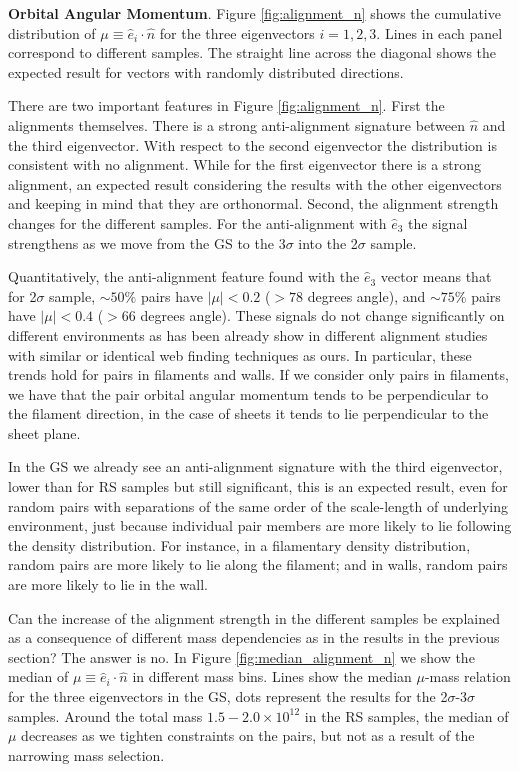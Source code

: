 \documentclass{emulateapj}
\newcommand{\msun}{{\ifmmode{{\rm {M_{\odot}}}}\else{${\rm{M_{\odot}}}$}\fi}}
\begin{document}
{\bf Orbital Angular Momentum}. Figure \ref{fig:alignment_n} shows the
cumulative distribution of $\mu\equiv\hat{e}_i\cdot\hat{n}$  for the
three eigenvectors $i=1,2,3$.    
Lines in each panel correspond to different samples.
The straight line across the diagonal shows the expected
result for vectors with randomly distributed directions.


There are two important features in Figure \ref{fig:alignment_n}.
First the alignments themselves. 
There is a strong anti-alignment signature between $\hat{n}$ and the
third eigenvector. 
With respect to the second eigenvector the distribution is consistent
with no alignment. 
While for the first eigenvector there is a strong alignment, an expected
result considering the results with the other eigenvectors and
keeping in mind that they are orthonormal.
Second, the alignment strength changes for the different samples. 
For the anti-alignment with $\hat{e}_3$ the signal strengthens as we
move from the GS to the 3$\sigma$ into the 2$\sigma$ sample.

Quantitatively, the anti-alignment feature found with the $\hat{e}_3$ 
vector means that for 2$\sigma$ sample, $\sim 50\%$ pairs have
$|\mu|<0.2$ ($>78$ degrees angle), and $\sim 75\%$ pairs have $|\mu|<0.4$
($>66$ degrees angle). 
These signals do not change significantly on
different environments as has been already show in different alignment
studies with similar \citep{Libeskind2013} or identical
\citep{ForeroRomero2014} web finding techniques as ours.
In particular, these trends hold for pairs in filaments and walls.
If we consider only pairs in filaments, we have that the pair orbital
angular momentum tends to be perpendicular to the filament direction,
in the case of sheets it tends to lie perpendicular to the sheet plane.

In the GS we already see an anti-alignment signature with the third eigenvector,
lower than for RS samples but still significant, this is an expected result,
even for random pairs with separations of the same order of the scale-length of 
underlying environment, just because individual pair members are more likely to lie 
following the density distribution. For instance, in a filamentary density distribution, random 
pairs are more likely to lie along the filament; and in walls, random pairs are more likely
to lie in the wall.

Can the increase of the alignment strength in the different samples be
explained as a consequence of different mass dependencies as in the
results in the previous section? The answer is no. 
In Figure \ref{fig:median_alignment_n} we show the median of
$\mu\equiv\hat{e}_i\cdot\hat{n}$ in different mass bins.
Lines show the median $\mu$-mass relation for the three 
eigenvectors in the GS, dots represent the results for the
2$\sigma$-3$\sigma$ samples. 
Around the total mass $1.5-2.0 \times 10^{12}$ \msun in the RS
samples, the median of $\mu$ decreases as we tighten constraints
on the pairs, but not as a result of the narrowing mass selection. 
\end{document}
